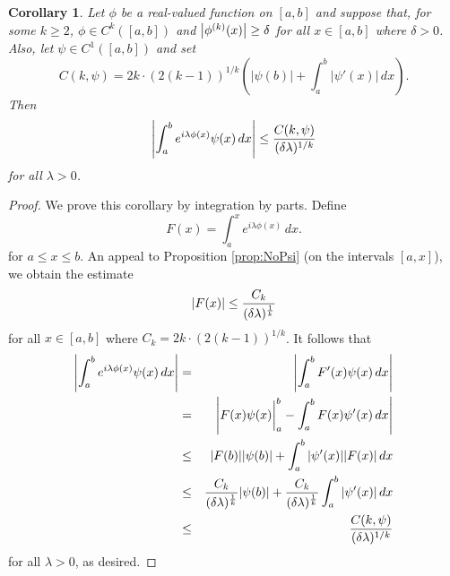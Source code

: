\documentclass[11pt, letter]{book}
\newtheorem{corollary}[theorem]{Corollary}
\newcommand{\f}[2]{\frac{#1}{#2}}
\begin{document}
\begin{framed}
\begin{corollary}\label{cor:psi}
Let $\phi$ be a real-valued function on $[a,b]$ and suppose that, for some $k\geq 2$, $\phi\in C^k([a,b])$ and $\abs{\phi^{(k)}(x)} \geq \delta$ for all $x\in [a,b]$ where $\delta>0$. Also, let $\psi\in C^1([a,b])$ and set
\begin{equation*}
C(k,\psi)=2k\cdot(2(k-1))^{1/k}\left(|\psi(b)|+\int_a^b|\psi'(x)|\,dx\right).
\end{equation*}
Then
\begin{equation*}
    \abs{\int_a^b e^{i\lambda \phi(x)} \psi(x) \,dx} \leq \frac{C(k,\psi)}{(\delta \lambda)^{1/k}}
\end{equation*}
for all $\lambda>0$.
\end{corollary}
\end{framed}
\begin{proof}
We prove this corollary by integration by parts. Define
\begin{equation*}
    F(x) = \int_a^x e^{i\lambda \phi(x)}\,dx.
\end{equation*}
for $a\leq x\leq b$. An appeal to Proposition \ref{prop:NoPsi} (on the intervals $[a,x]$), we obtain the estimate
\begin{equation*}
    \abs{F(x)} \leq \f{C_k}{(\delta\lambda)^{\f{1}{k}}}
\end{equation*}
for all $x\in [a,b]$ where $C_k=2k\cdot(2(k-1))^{1/k}$. It follows that 
\begin{eqnarray*}
     \abs{\int_a^b e^{i\lambda \phi(x)} \psi(x) \,dx} 
     &=& \abs{\int_a^b F'(x)\psi(x)\,dx}  \\
     &=& \abs{ F(x)\psi(x)\bigg\vert_{a}^b - \int_a^b F(x)\psi'(x)\,dx   } \\
     &\leq& \abs{F(b)}\abs{ \psi(b)} + \int_a^b \abs{\psi'(x)}\abs{ F(x)}\, dx  \\
     &\leq& \f{C_k}{(\delta\lambda)^{\f{1}{k}}}\abs{\psi(b)} + \f{C_k}{(\delta\lambda)^{\f{1}{k}}} \int_a^b \abs{\psi'(x)}\,dx\\
     &\leq& \frac{C(k,\psi)}{(\delta\lambda)^{1/k}}
\end{eqnarray*}
for all $\lambda>0$, as desired.
\end{proof}
\end{document}
